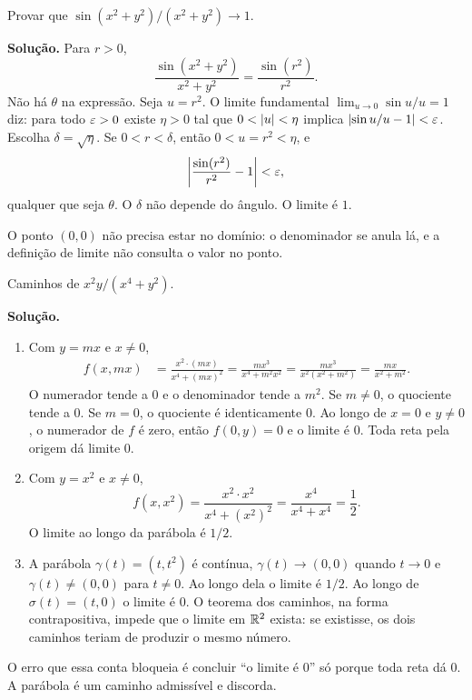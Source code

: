 \documentclass[11pt,a4paper]{article}
\begin{document}
\begin{exercicio}
Provar que $\sin(x^2+y^2)/(x^2+y^2)\to 1$.

\textbf{Solução.}
Para $r>0$,
\[
\frac{\sin(x^2+y^2)}{x^2+y^2}=\frac{\sin(r^2)}{r^2}.
\]
Não há $\theta$ na expressão. Seja $u=r^2$. O limite fundamental $\lim_{u\to 0}\sin u/u=1$ diz: para todo $\varepsilon>0$ existe $\eta>0$ tal que $0<\left\lvert u \right\rvert<\eta$ implica $\left\lvert \sin u/u-1 \right\rvert<\varepsilon$. Escolha $\delta=\sqrt{\eta}$. Se $0<r<\delta$, então $0<u=r^2<\eta$, e
\[
\left\lvert \frac{\sin(r^2)}{r^2}-1 \right\rvert<\varepsilon,
\]
qualquer que seja $\theta$. O $\delta$ não depende do ângulo. O limite é $1$.

O ponto $(0,0)$ não precisa estar no domínio: o denominador se anula lá, e a definição de limite não consulta o valor no ponto.
\end{exercicio}

\begin{exercicio}
Caminhos de $x^2 y/(x^4+y^2)$.

\textbf{Solução.}
\begin{enumerate}[label=\alph*)]
\item Com $y=mx$ e $x\neq 0$,
\begin{align*}
f(x,mx)
&=\frac{x^2\cdot(mx)}{x^4+(mx)^2}
=\frac{m x^3}{x^4+m^2 x^2}
=\frac{m x^3}{x^2(x^2+m^2)}
=\frac{mx}{x^2+m^2}.
\end{align*}
O numerador tende a $0$ e o denominador tende a $m^2$. Se $m\neq 0$, o quociente tende a $0$. Se $m=0$, o quociente é identicamente $0$. Ao longo de $x=0$ e $y\neq 0$, o numerador de $f$ é zero, então $f(0,y)=0$ e o limite é $0$. Toda reta pela origem dá limite $0$.

\item Com $y=x^2$ e $x\neq 0$,
\[
f(x,x^2)=\frac{x^2\cdot x^2}{x^4+(x^2)^2}=\frac{x^4}{x^4+x^4}=\frac{1}{2}.
\]
O limite ao longo da parábola é $1/2$.

\item A parábola $\gamma(t)=(t,t^2)$ é contínua, $\gamma(t)\to(0,0)$ quando $t\to 0$ e $\gamma(t)\neq(0,0)$ para $t\neq 0$. Ao longo dela o limite é $1/2$. Ao longo de $\sigma(t)=(t,0)$ o limite é $0$. O teorema dos caminhos, na forma contrapositiva, impede que o limite em $\mathbb{R}^2$ exista: se existisse, os dois caminhos teriam de produzir o mesmo número.
\end{enumerate}
O erro que essa conta bloqueia é concluir ``o limite é $0$'' só porque toda reta dá $0$. A parábola é um caminho admissível e discorda.
\end{exercicio}
\end{document}
